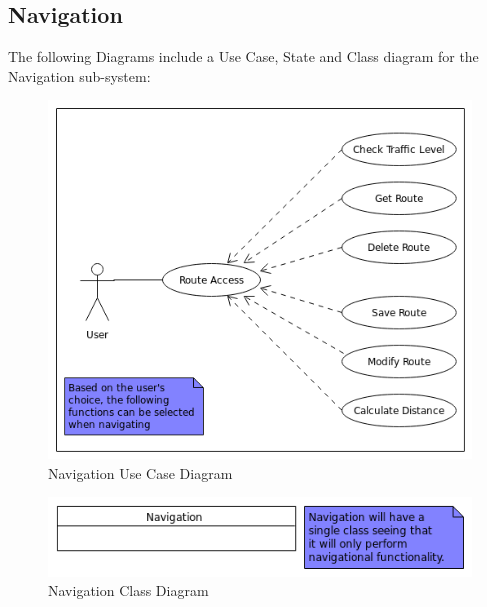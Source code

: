 \documentclass{article}
\begin{document}
	\subsection{Navigation}
	The following Diagrams include a Use Case, State and Class diagram for the Navigation sub-system:
	\FloatBarrier	
	\begin{figure}[h]
		\caption{Navigation Use Case Diagram}
  		\includegraphics[width=\textwidth]{Images/NavigationUseCase.png}
	\end{figure}
	\begin{figure}[h]
		\caption{Navigation Class Diagram}
  		\includegraphics[width=\textwidth]{Images/NavigationClass.png}
	\end{figure}
\end{document}
